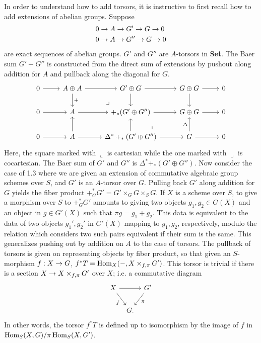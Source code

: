 \documentclass[deligne.tex]{subfiles}
\begin{document}
In order to understand how to add torsors, it is instructive to first recall
how to add extensions of abelian groups. Suppose
\begin{align*}
	&0\rightarrow A\rightarrow G'\rightarrow G\rightarrow 0 \\
	&0\rightarrow A\rightarrow G''\rightarrow G\rightarrow 0
\end{align*}
are exact sequences of abelian groups. $G'$ and $G''$ are $A$-torsors in
\textbf{Set}. The Baer sum $G'+G''$ is constructed from the direct sum of
extensions by pushout along addition for $A$ and pullback along the diagonal 
for $G$.
\begin{equation*}\begin{tikzcd}
	0\arrow[r]&A\oplus A\arrow[dr,phantom,"\lrcorner",near end]\arrow[r]\arrow[d,"+"] &G'\oplus G\arrow[r]\arrow[d] &G\oplus G\arrow[r]\arrow[d]&0 \\
	0\arrow[r]&A\arrow[r]&+_*(G'\oplus G'')\arrow[r]&G\oplus G\arrow[r] \arrow[dl,phantom,"\llcorner",near end]&0 \\
	0\arrow[r]&A\arrow[r]\arrow[u]&\Delta^*+_*(G'\oplus G'')\arrow[r]\arrow[u]&G\arrow[r]\arrow[u,"\Delta"]&0
\end{tikzcd}\end{equation*}
Here, the square marked with $\llcorner$ is cartesian while the one marked 
with $\lrcorner$ is cocartesian.
The Baer sum of $G'$ and $G''$ is $\Delta^*+_*(G'\oplus G'')$.
Now consider the case of 1.3 where we are given an extension of commutative
algebraic group schemes over $S$, and $G'$ is an $A$-torsor over $G$.
Pulling back $G'$ along addition for $G$ yields the fiber product
$+_G^*G'=G'\times_G G\times_S G$.
If $X$ is a scheme over $S$, to give a morphism over $S$ to $+_G^*G'$
amounts to giving two objects $g_1,g_2\in G(X)$ and an object in
$g\in G'(X)$ such that $\pi g=g_1+g_2$.
This data is equivalent to the data of two objects $g_1',g_2'$ in $G'(X)$
mapping to $g_1,g_2$, respectively, modulo the relation which considers two
such pairs equivalent if their sum is the same.
This generalizes pushing out by addition on $A$ to the case of torsors.
The pullback of torsors is given on representing objects by fiber product,
so that given an $S$-morphism $f:X\rightarrow G$, $f^*T=\operatorname{Hom}_X(-,X\times_{f,\pi} G')$.
This torsor is trivial if there is a section $X\rightarrow X\times_{f,\pi} G'$ over $X$;
i.e. a commutative diagram
\begin{equation*}\begin{tikzcd}[column sep=tiny]
	X\arrow[rr]\arrow[dr,"f"']&&G'\arrow[dl,"\pi"] \\
	&G.
\end{tikzcd}\end{equation*}
In other words, the torsor $f^*T$ is defined up to isomorphism by the image
of $f$ in $\operatorname{Hom}_S(X,G)/\pi\operatorname{Hom}_S(X,G')$.
\end{document}

